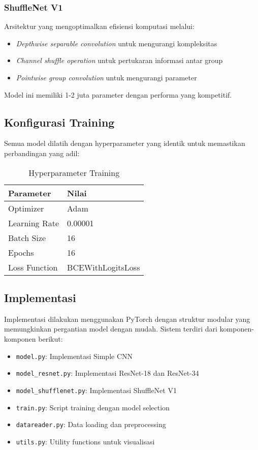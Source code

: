 \documentclass[conference]{IEEEtran}
\begin{document}
\subsubsection{ShuffleNet V1}
Arsitektur yang mengoptimalkan efisiensi komputasi melalui:
\begin{itemize}
    \item \textit{Depthwise separable convolution} untuk mengurangi kompleksitas
    \item \textit{Channel shuffle operation} untuk pertukaran informasi antar group
    \item \textit{Pointwise group convolution} untuk mengurangi parameter
\end{itemize}
Model ini memiliki 1-2 juta parameter dengan performa yang kompetitif.

\subsection{Konfigurasi Training}
Semua model dilatih dengan hyperparameter yang identik untuk memastikan perbandingan yang adil:

\begin{table}[h]
\centering
\caption{Hyperparameter Training}
\label{tab:hyperparameters}
\begin{tabular}{ll}
\toprule
\textbf{Parameter} & \textbf{Nilai} \\
\midrule
Optimizer & Adam \\
Learning Rate & 0.00001 \\
Batch Size & 16 \\
Epochs & 16 \\
Loss Function & BCEWithLogitsLoss \\
\bottomrule
\end{tabular}
\end{table}

\subsection{Implementasi}
Implementasi dilakukan menggunakan PyTorch dengan struktur modular yang memungkinkan pergantian model dengan mudah. Sistem terdiri dari komponen-komponen berikut:

\begin{itemize}
    \item \texttt{model.py}: Implementasi Simple CNN
    \item \texttt{model\_resnet.py}: Implementasi ResNet-18 dan ResNet-34
    \item \texttt{model\_shufflenet.py}: Implementasi ShuffleNet V1
    \item \texttt{train.py}: Script training dengan model selection
    \item \texttt{datareader.py}: Data loading dan preprocessing
    \item \texttt{utils.py}: Utility functions untuk visualisasi
\end{itemize}
\end{document}
